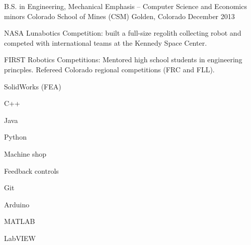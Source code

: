 

\begin{cventries}

  \cventry%
    {B.S. in Engineering, Mechanical Emphasis \--- Computer Science and Economics minors} %
    {Colorado School of Mines (CSM)} %
    {Golden, Colorado} %
    {December 2013} %
    {%
      \begin{cvitems} %
        \item{NASA Lunabotics Competition: built a full-size regolith collecting robot and competed with international teams at the Kennedy Space Center.}
        \item{FIRST Robotics Competitions: Mentored high school students in engineering princples. Refereed Colorado regional competitions (FRC and FLL).}
      \end{cvitems}
    }
    \begin{cventryskills}
      \item SolidWorks (FEA)
      \item C++
      \item Java
      \item Python
      \item Machine shop
      \item Feedback controls
      \item Git
      \item Arduino
      \item MATLAB
      \item LabVIEW
    \end{cventryskills}

\end{cventries}
